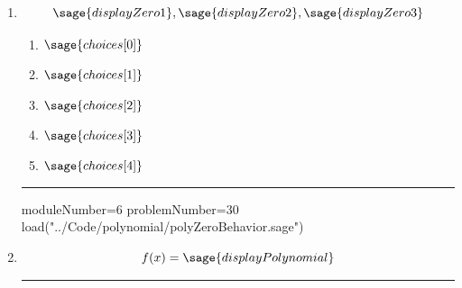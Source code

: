 \documentclass[14pt]{article}
\newcommand{\litem}[1]{\item#1\hspace*{-1cm}\rule{\textwidth}{0.4pt}}
\begin{document}
\begin{enumerate}
\litem{ 

	\[ \sage{displayZero1}, \sage{displayZero2}, \sage{displayZero3} \]

	\begin{enumerate}[label=\Alph*.]
		\item \( \sage{choices[0]} \)
		\item \( \sage{choices[1]} \)
		\item \( \sage{choices[2]} \)
		\item \( \sage{choices[3]} \)
		\item \( \sage{choices[4]} \)
	\end{enumerate}
}

\begin{sagesilent}
moduleNumber=6
problemNumber=30
load("../Code/polynomial/polyZeroBehavior.sage")
\end{sagesilent}

\litem{ 

	\[ f(x) = \sage{displayPolynomial} \]

}
\end{enumerate}
\end{document}
